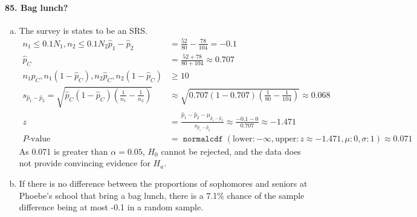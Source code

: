\documentclass[12pt, A4]{article}
\DeclareMathOperator{\normalcdf}{\texttt{normalcdf}}
\newcommand{\normalCDF}[4]{\normalcdf\left(\mathrm{lower}: #1, \mathrm{upper}: #2, \mu: #3, \sigma: #4\right)}
\newcommand{\propsee}[3]{\sqrt{#1\left(1 - #1\right)\left(\frac{1}{#2} - \frac{1}{#3}\right)}}
\newcommand{\z}[3]{\frac{#1 - #2}{#3}}
\begin{document}
			\paragraph{85. Bag lunch?}
				\begin{enumerate}[a.]
					\item
						The survey is states to be an SRS.
						\begin{align*}
							n_1 \le 0.1N_1, n_2 \le 0.1N_2
							\hat{p}_1 - \hat{p}_2 &= \frac{52}{80} - \frac{78}{104} = -0.1 \\
							\hat{p}_C &= \frac{52 + 78}{80 + 104} \approx 0.707 \\
							n_1\hat{p}_C, n_1(1 - \hat{p}_C), n_2\hat{p}_C, n_2(1 - \hat{p}_C) &\ge 10\\
							s_{\hat{p}_1 - \hat{p}_2} = \propsee{\hat{p}_C}{n_1}{n_2} &\approx \propsee{0.707}{80}{104} \approx 0.068 \\
							z &= \z{\hat{p}_1 - \hat{p}_2}{\mu_{\hat{p}_1 - \hat{p}_2}}{s_{\hat{p}_1 - \hat{p}_2}} \approx \z{-0.1}{0}{0.707} \approx -1.471 \\
							P\text{-value} &= \normalCDF{-\infty}{z \approx -1.471}{0}{1} \approx 0.071
						\end{align*}
						As 0.071 is greater than $\alpha = 0.05$, $H_0$ cannot be rejected, and the data does not provide convincing evidence for $H_a$.
					\item
						If there is no difference between the proportions of sophomores and seniors at Phoebe's school that bring a bag lunch, there is a 7.1\% chance of the sample difference being at most -0.1 in a random sample.
				\end{enumerate}
\end{document}

